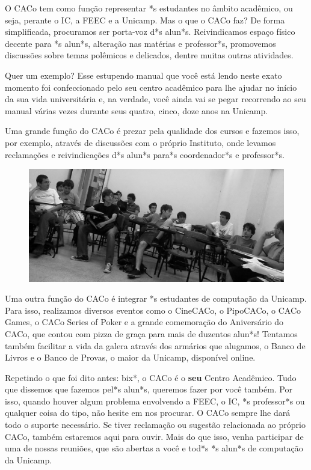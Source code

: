 O CACo tem como função representar *s estudantes no âmbito acadêmico, ou seja,
perante o IC, a FEEC e a Unicamp. Mas o que o CACo faz? De forma simplificada,
procuramos ser porta-voz d*s alun*s. Reivindicamos espaço físico decente para *s
alun*s, alteração nas matérias e professor*s, promovemos discussões sobre temas
polêmicos e delicados, dentre muitas outras atividades.

Quer um exemplo? Esse estupendo manual que você está lendo neste exato momento
foi confeccionado pelo seu centro acadêmico para lhe ajudar no início da sua
vida universitária e, na verdade, você ainda vai se pegar recorrendo ao seu
manual várias vezes durante seus quatro, cinco, doze anos na Unicamp.

Uma grande função do CACo é prezar pela qualidade dos cursos e fazemos isso, por
exemplo, através de discussões com o próprio Instituto, onde levamos reclamações
e reivindicações d*s alun*s para*s coordenador*s e professor*s.

\begin{figure}[H]
    \centering
    \includegraphics[width=.45\textwidth]{img/alem_da_graduacao/caco_reuniao.jpg}
\end{figure}

Uma outra função do CACo é integrar *s estudantes de computação da Unicamp. Para
isso, realizamos diversos eventos como o CineCACo, o PipoCACo, o CACo Games, o
CACo Series of Poker e a grande comemoração do Aniversário do CACo, que contou
com pizza de graça para mais de duzentos alun*s! Tentamos também facilitar a
vida da galera através dos armários que alugamos, o Banco de Livros e o Banco de
Provas, o maior da Unicamp, disponível online.

Repetindo o que foi dito antes: bix*, o CACo é o \textbf{seu} Centro Acadêmico.
Tudo que dissemos que fazemos pel*s alun*s, queremos fazer por você também. Por
isso, quando houver algum problema envolvendo a FEEC, o IC, *s professor*s ou
qualquer coisa do tipo, não hesite em nos procurar. O CACo sempre lhe dará todo
o suporte necessário. Se tiver reclamação ou sugestão relacionada ao próprio
CACo, também estaremos aqui para ouvir. Mais do que isso, venha participar de
uma de nossas reuniões, que são abertas a você e tod*s *s alun*s de computação
da Unicamp.

